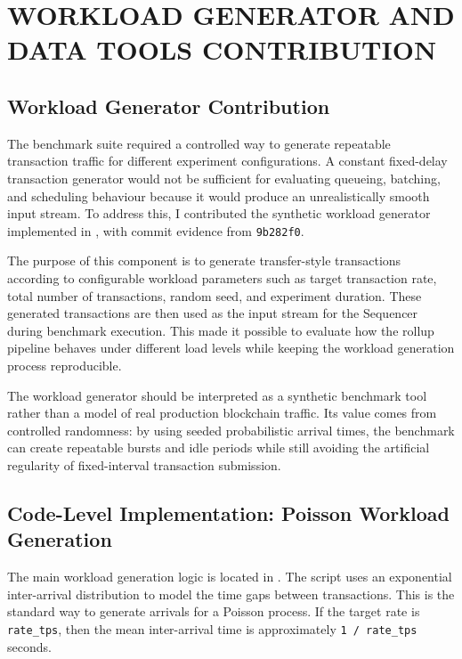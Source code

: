 \chapter{WORKLOAD GENERATOR AND DATA TOOLS CONTRIBUTION}

\section{Workload Generator Contribution}

The benchmark suite required a controlled way to generate repeatable transaction traffic for different experiment configurations. A constant fixed-delay transaction generator would not be sufficient for evaluating queueing, batching, and scheduling behaviour because it would produce an unrealistically smooth input stream. To address this, I contributed the synthetic workload generator implemented in , with commit evidence from \texttt{9b282f0}.

The purpose of this component is to generate transfer-style transactions according to configurable workload parameters such as target transaction rate, total number of transactions, random seed, and experiment duration. These generated transactions are then used as the input stream for the Sequencer during benchmark execution. This made it possible to evaluate how the rollup pipeline behaves under different load levels while keeping the workload generation process reproducible.

The workload generator should be interpreted as a synthetic benchmark tool rather than a model of real production blockchain traffic. Its value comes from controlled randomness: by using seeded probabilistic arrival times, the benchmark can create repeatable bursts and idle periods while still avoiding the artificial regularity of fixed-interval transaction submission.

\section{Code-Level Implementation: Poisson Workload Generation}

The main workload generation logic is located in . The script uses an exponential inter-arrival distribution to model the time gaps between transactions. This is the standard way to generate arrivals for a Poisson process. If the target rate is \texttt{rate\_tps}, then the mean inter-arrival time is approximately \texttt{1 / rate\_tps} seconds.

